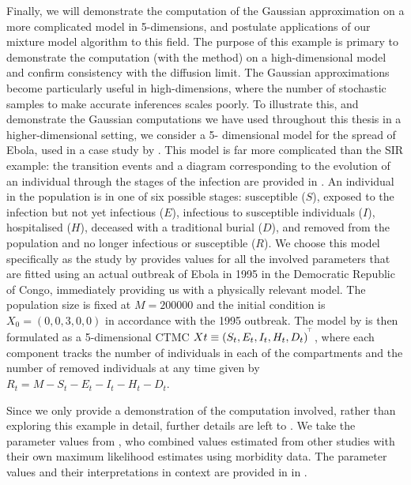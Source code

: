 Finally, we will demonstrate the computation of the Gaussian approximation on a more complicated model in 5-dimensions, and postulate applications of our mixture model algorithm to this field.
The purpose of this example is primary to demonstrate the computation (with the \citet{Mazzoni_2008_ComputationalAspectsContinuous} method) on a high-dimensional model and confirm consistency with the diffusion limit.
The Gaussian approximations become particularly useful in high-dimensions, where the number of stochastic samples to make accurate inferences scales poorly.
To illustrate this, and demonstrate the Gaussian computations we have used throughout this thesis in a higher-dimensional setting, we consider a 5- dimensional model for the spread of Ebola, used in a case study by \citet{LegrandEtAl_2007_UnderstandingDynamicsEbola}.
This model is far more complicated than the SIR example: the transition events and a diagram corresponding to the evolution of an individual through the stages of the infection are provided in .
An individual in the population is in one of six possible stages: susceptible (\(S\)), exposed to the infection but not yet infectious (\(E\)), infectious to susceptible individuals (\(I\)), hospitalised (\(H\)), deceased with a traditional burial (\(D\)), and removed from the population and no longer infectious or susceptible (\(R\)).
We choose this model specifically as the study by \citet{LegrandEtAl_2007_UnderstandingDynamicsEbola} provides values for all the involved parameters that are fitted using an actual outbreak of Ebola in 1995 in the Democratic Republic of Congo, immediately providing us with a physically relevant model. The population size is fixed at \(M = 200000\) \citep{DowellEtAl_1999_TransmissionEbolaHemorrhagic} and the initial condition is \(X_0 = (0, 0, 3, 0, 0)\) \citep{KhanEtAl_1999_ReemergenceEbolaHemorrhagic} in accordance with the 1995 outbreak. The
model by \citet{LegrandEtAl_2007_UnderstandingDynamicsEbola} is then formulated as a 5-dimensional CTMC \(Xt \equiv \left(S_t, E_t, I_t, H_t, D_t\right)^{^{\!\top}}\), where each component tracks the number of individuals in each of the compartments and the number of removed individuals at any time given by \(R_t = M - S_t - E_t - I_t - H_t - D_t\).

Since we only provide a demonstration of the computation involved, rather than exploring this example in detail, further details are left to .
We take the parameter values from \citet{LegrandEtAl_2007_UnderstandingDynamicsEbola}, who combined values estimated from other studies \citep{BwakaEtAl_1999_EbolaHemorrhagicFever,DowellEtAl_1999_TransmissionEbolaHemorrhagic,KhanEtAl_1999_ReemergenceEbolaHemorrhagic,NdambiEtAl_1999_EpidemiologicClinicalAspects,RoweEtAl_1999_ClinicalVirologicImmunologic} with their own maximum likelihood estimates using morbidity data. The parameter values and their interpretations in context are provided in  in .

